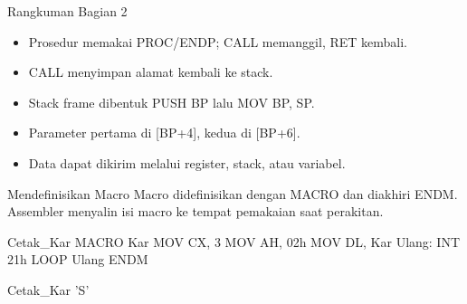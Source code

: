 \documentclass[aspectratio=169,11pt]{beamer}
\begin{document}
\begin{frame}{Rangkuman Bagian 2}
\small
\begin{itemize}
    \item Prosedur memakai PROC/ENDP; CALL memanggil, RET kembali.

    \vspace{0.15em}
    \item CALL menyimpan alamat kembali ke stack.

    \vspace{0.15em}
    \item Stack frame dibentuk PUSH BP lalu MOV BP, SP.

    \vspace{0.15em}
    \item Parameter pertama di [BP+4], kedua di [BP+6].

    \vspace{0.15em}
    \item Data dapat dikirim melalui register, stack, atau variabel.
\end{itemize}
\end{frame}


\begin{frame}[fragile]{Mendefinisikan Macro}
\small
Macro didefinisikan dengan MACRO dan diakhiri ENDM. Assembler
menyalin isi macro ke tempat pemakaian saat perakitan.

\vspace{0.2em}
\begin{kodeasm}[numbers=none]
Cetak_Kar MACRO Kar
    MOV CX, 3
    MOV AH, 02h
    MOV DL, Kar
Ulang:
    INT 21h
    LOOP Ulang
ENDM

Cetak_Kar 'S'
\end{kodeasm}
\end{frame}
\end{document}
